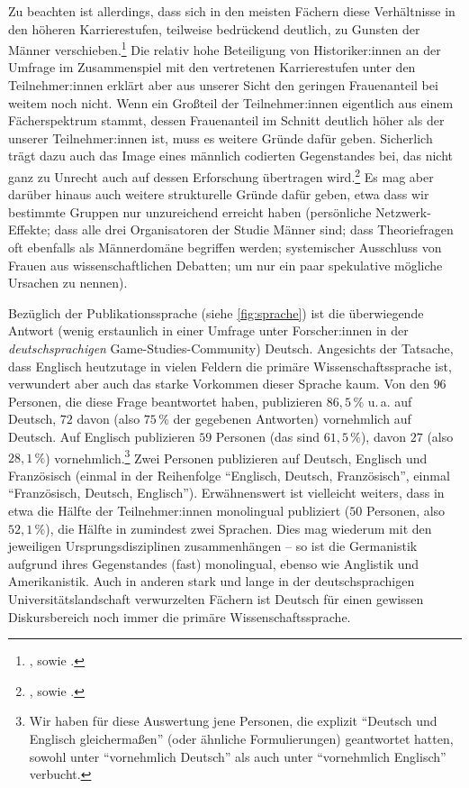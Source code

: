 \documentclass{scrartcl}
\begin{document}
Zu beachten ist allerdings, dass sich in den meisten Fächern diese Verhältnisse in den höheren Karrierestufen, teilweise bedrückend deutlich, zu Gunsten der Männer verschieben.\footnote{\autocite[Vgl. z.\,B.][]{blickenstaff_women_2005}, sowie \autocite[][]{innovative_frauen_im_fokus_leaky_2025}.}
Die relativ hohe Beteiligung von Historiker:innen an der Umfrage im Zusammenspiel mit den vertretenen Karrierestufen unter den Teilnehmer:innen erklärt aber aus unserer Sicht den geringen Frauenanteil bei weitem noch nicht.
Wenn ein Großteil der Teilnehmer:innen eigentlich aus einem Fächerspektrum stammt, dessen Frauenanteil im Schnitt deutlich höher als der unserer Teilnehmer:innen ist, muss es weitere Gründe dafür geben.
Sicherlich trägt dazu auch das Image eines männlich codierten Gegenstandes bei, das nicht ganz zu Unrecht auch auf dessen Erforschung übertragen wird.\footnote{\autocite[Vgl.][S.~28]{unterhuber_wer_2024}, sowie \autocite[][S.~214]{vossen_cultural_2018}.}
Es mag aber darüber hinaus auch weitere strukturelle Gründe dafür geben, etwa dass wir bestimmte Gruppen nur unzureichend erreicht haben (persönliche Netzwerk-Effekte; dass alle drei Organisatoren der Studie Männer sind; dass Theoriefragen oft ebenfalls als Männerdomäne begriffen werden; systemischer Ausschluss von Frauen aus wissenschaftlichen Debatten; um nur ein paar spekulative mögliche Ursachen zu nennen).

Bezüglich der Publikationssprache (siehe \autoref{fig:sprache}) ist die überwiegende Antwort (wenig erstaunlich in einer Umfrage unter Forscher:innen in der \textit{deutschsprachigen} Game-Studies-Community) Deutsch.
Angesichts der Tatsache, dass Englisch heutzutage in vielen Feldern die primäre Wissenschaftssprache ist, verwundert aber auch das starke Vorkommen dieser Sprache kaum.
Von den $96$ Personen, die diese Frage beantwortet haben, publizieren $86,5\,\%$ u.\,a. auf Deutsch, $72$ davon (also $75\,\%$ der gegebenen Antworten) vornehmlich auf Deutsch.
Auf Englisch publizieren $59$ Personen (das sind $61,5\,\%$), davon $27$ (also $28,1\,\%$) vornehmlich.\footnote{Wir haben für diese Auswertung jene Personen, die explizit \enquote{Deutsch und Englisch gleichermaßen} (oder ähnliche Formulierungen) geantwortet hatten, sowohl unter \enquote{vornehmlich Deutsch} als auch unter \enquote{vornehmlich Englisch} verbucht.}
Zwei Personen publizieren auf Deutsch, Englisch und Französisch (einmal in der Reihenfolge \enquote{Englisch, Deutsch, Französisch}, einmal \enquote{Französisch, Deutsch, Englisch}).
Erwähnenswert ist vielleicht weiters, dass in etwa die Hälfte der Teilnehmer:innen monolingual publiziert ($50$ Personen, also $52,1\,\%$), die Hälfte in zumindest zwei Sprachen.
Dies mag wiederum mit den jeweiligen Ursprungsdisziplinen zusammenhängen -- so ist die Germanistik aufgrund ihres Gegenstandes (fast) monolingual, ebenso wie Anglistik und Amerikanistik.
Auch in anderen stark und lange in der deutschsprachigen Universitätslandschaft verwurzelten Fächern ist Deutsch für einen gewissen Diskursbereich noch immer die primäre Wissenschaftssprache.
\end{document}
